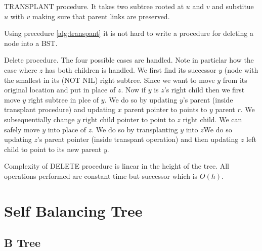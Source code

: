 \begin{algorithm}
\caption{TRANSPLANT procedure. It takes two subtree rooted at $u$ and $v$ and substitue $u$ with $v$ making sure that parent links are preserved.}\label{alg:transpant}
\end{algorithm}

Using precedure \ref{alg:transpant} it is not hard to write a procedure for deleting a node into a BST.
\begin{algorithm}
\caption{Delete procedure. The four possible cases are handled.  Note in particlar how the case where $z$ has both children is handled. We first find its successor $y$ (node with the  smallest in its (NOT NIL) right subtree. Since we want to move $y$ from its original location and put in place of $z$. Now if $y$ is $z$'s right child then we first move $y$ right subtree in plce of $y$. We do so by updating $y$'s parent (inside transplant procedure) and updating $x$ parent pointer  to points to $y$ parent $r$. We subsequentially change $y$ right child pointer to point to $z$ right child. We can safely move $y$ into place of $z$. We do so by transplanting $y$ into $z$We do so updating $z$'s parent pointer (inside transpant operation) and then updating $z$ left child to point to its new parent $y$.}\label{alg:transpant}
\end{algorithm}

Complexity of DELETE procedure is linear in the height of the tree. All operations performed are constant time but successor which is $O(h)$.

\section{Self Balancing Tree}
\subsection{B Tree}
